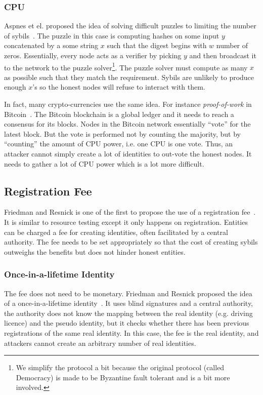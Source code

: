 \subsubsection{CPU}
Aspnes et el. proposed the idea of solving difficult puzzles to limiting the
number of sybils~\cite{aspnes2005exposing}. The puzzle in this case is computing
hashes on some input $y$ concatenated by a some string $x$ such that the digest
begins with $w$ number of zeros. Essentially, every node acts as a verifier by
picking $y$ and then broadcast it to the network to the puzzle
solver\footnote{We simplify the protocol a bit because the original protocol
  (called Democracy) is made to be Byzantine fault tolerant and is a bit more
  involved.}. The puzzle solver must compute as many $x$ as possible such that
they match the requirement. Sybils are unlikely to produce enough $x$'s so the
honest nodes will refuse to interact with them.

In fact, many crypto-currencies use the same idea. For instance
\emph{proof-of-work} in Bitcoin~\cite{nakamoto2008bitcoin}. The Bitcoin
blockchain is a global ledger and it needs to reach a consensus for its blocks.
Nodes in the Bitcoin network essentially ``vote'' for the latest block. But the
vote is performed not by counting the majority, but by ``counting'' the amount
of CPU power, i.e. one CPU is one vote. Thus, an attacker cannot simply create a
lot of identities to out-vote the honest nodes. It needs to gather a lot of CPU
power which is a lot more difficult.


\subsection{Registration Fee}\label{sec:registration-fee}

Friedman and Resnick is one of the first to propose the use of a registration
fee~\cite{resnick2001social}. It is similar to resource testing except it only
happens on registration. Entities can be charged a fee for creating identities,
often facilitated by a central authority. The fee needs to be set appropriately
so that the cost of creating sybils outweighs the benefits but does not hinder
honest entities.

\subsubsection{Once-in-a-lifetime Identity}
The fee does not need to be monetary. Friedman and Resnick proposed the idea of
a once-in-a-lifetime identity~\cite{resnick2001social}. It uses blind signatures
and a central authority, the authority does not know the mapping between the
real identity (e.g. driving licence) and the pseudo identity, but it checks
whether there has been previous registrations of the same real identity. In this
case, the fee is the real identity, and attackers cannot create an arbitrary
number of real identities.

